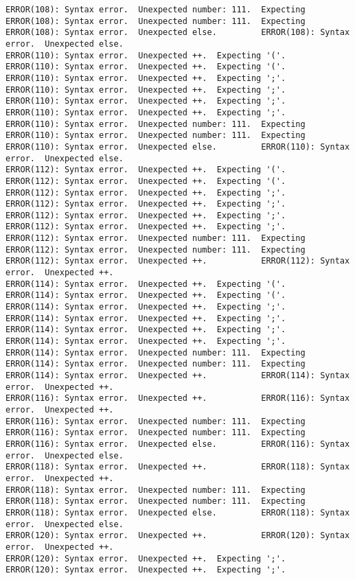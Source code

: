 \documentclass[12pt]{book}
\begin{document}
\begin{lstlisting}
ERROR(108): Syntax error.  Unexpected number: 111.  Expecting	ERROR(108): Syntax error.  Unexpected number: 111.  Expecting
ERROR(108): Syntax error.  Unexpected else.			ERROR(108): Syntax error.  Unexpected else.
ERROR(110): Syntax error.  Unexpected ++.  Expecting '('.	ERROR(110): Syntax error.  Unexpected ++.  Expecting '('.
ERROR(110): Syntax error.  Unexpected ++.  Expecting ';'.	ERROR(110): Syntax error.  Unexpected ++.  Expecting ';'.
ERROR(110): Syntax error.  Unexpected ++.  Expecting ';'.	ERROR(110): Syntax error.  Unexpected ++.  Expecting ';'.
ERROR(110): Syntax error.  Unexpected number: 111.  Expecting	ERROR(110): Syntax error.  Unexpected number: 111.  Expecting
ERROR(110): Syntax error.  Unexpected else.			ERROR(110): Syntax error.  Unexpected else.
ERROR(112): Syntax error.  Unexpected ++.  Expecting '('.	ERROR(112): Syntax error.  Unexpected ++.  Expecting '('.
ERROR(112): Syntax error.  Unexpected ++.  Expecting ';'.	ERROR(112): Syntax error.  Unexpected ++.  Expecting ';'.
ERROR(112): Syntax error.  Unexpected ++.  Expecting ';'.	ERROR(112): Syntax error.  Unexpected ++.  Expecting ';'.
ERROR(112): Syntax error.  Unexpected number: 111.  Expecting	ERROR(112): Syntax error.  Unexpected number: 111.  Expecting
ERROR(112): Syntax error.  Unexpected ++.			ERROR(112): Syntax error.  Unexpected ++.
ERROR(114): Syntax error.  Unexpected ++.  Expecting '('.	ERROR(114): Syntax error.  Unexpected ++.  Expecting '('.
ERROR(114): Syntax error.  Unexpected ++.  Expecting ';'.	ERROR(114): Syntax error.  Unexpected ++.  Expecting ';'.
ERROR(114): Syntax error.  Unexpected ++.  Expecting ';'.	ERROR(114): Syntax error.  Unexpected ++.  Expecting ';'.
ERROR(114): Syntax error.  Unexpected number: 111.  Expecting	ERROR(114): Syntax error.  Unexpected number: 111.  Expecting
ERROR(114): Syntax error.  Unexpected ++.			ERROR(114): Syntax error.  Unexpected ++.
ERROR(116): Syntax error.  Unexpected ++.			ERROR(116): Syntax error.  Unexpected ++.
ERROR(116): Syntax error.  Unexpected number: 111.  Expecting	ERROR(116): Syntax error.  Unexpected number: 111.  Expecting
ERROR(116): Syntax error.  Unexpected else.			ERROR(116): Syntax error.  Unexpected else.
ERROR(118): Syntax error.  Unexpected ++.			ERROR(118): Syntax error.  Unexpected ++.
ERROR(118): Syntax error.  Unexpected number: 111.  Expecting	ERROR(118): Syntax error.  Unexpected number: 111.  Expecting
ERROR(118): Syntax error.  Unexpected else.			ERROR(118): Syntax error.  Unexpected else.
ERROR(120): Syntax error.  Unexpected ++.			ERROR(120): Syntax error.  Unexpected ++.
ERROR(120): Syntax error.  Unexpected ++.  Expecting ';'.	ERROR(120): Syntax error.  Unexpected ++.  Expecting ';'.

\end{lstlisting}
\end{document}
